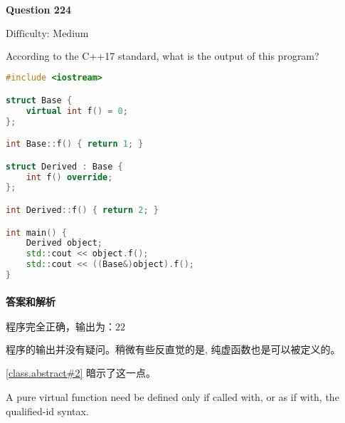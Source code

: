 \documentclass{article}
\begin{document}
	\paragraph*{Question 224}\noindent $\boxed{\text{Difficulty: Medium}} $
	
	According to the C++17 standard, what is the output of this program? 
	
	\begin{lstlisting}[language=C++]    
#include <iostream>

struct Base {
	virtual int f() = 0; 
};

int Base::f() { return 1; }

struct Derived : Base {
	int f() override;
};

int Derived::f() { return 2; }

int main() {
	Derived object;
	std::cout << object.f();
	std::cout << ((Base&)object).f();
}
	\end{lstlisting}
	
	\paragraph*{答案和解析} $\boxed{\text{程序完全正确，输出为：22}} $
	
	程序的输出并没有疑问。稍微有些反直觉的是, 纯虚函数也是可以被定义的。
	
	\href{https://timsong-cpp.github.io/cppwp/n4659/class.abstract#2}{[class.abstract\#2]} 暗示了这一点。
	
	\begin{lightgrayleftbar}
		A pure virtual function need be defined only if called with, or as if with, the qualified-id syntax.
	\end{lightgrayleftbar}
\end{document}
